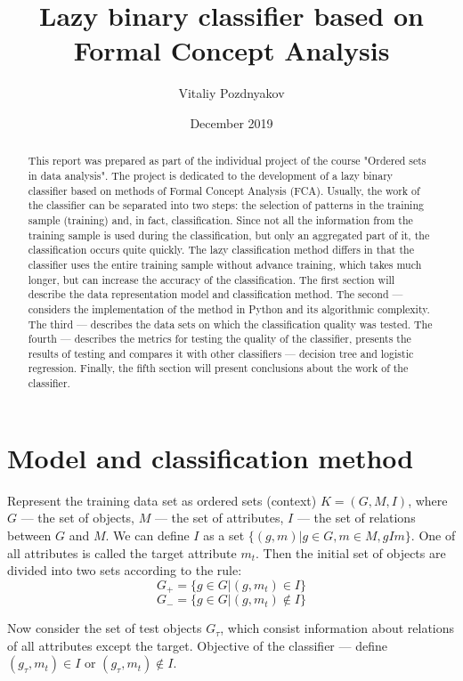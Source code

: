 \documentclass{article}
\author{Vitaliy Pozdnyakov}
\title{Lazy binary classifier based on Formal Concept Analysis}
\date{December 2019}
\begin{document}
\maketitle

\begin{abstract}
	This report was prepared as part of the individual project of the course "Ordered sets in data analysis". The project is dedicated to the development of a lazy binary classifier based on methods of Formal Concept Analysis (FCA). Usually, the work of the classifier can be separated into two steps: the selection of patterns in the training sample (training) and, in fact, classification. Since not all the information from the training sample is used during the classification, but only an aggregated part of it, the classification occurs quite quickly. The lazy classification method differs in that the classifier uses the entire training sample without advance training, which takes much longer, but can increase the accuracy of the classification. The first section will describe the data representation model and classification method. The second --- considers the implementation of the method in Python and its algorithmic complexity. The third --- describes the data sets on which the classification quality was tested. The fourth --- describes the metrics for testing the quality of the classifier, presents the results of testing and compares it with other classifiers --- decision tree and logistic regression. Finally, the fifth section will present conclusions about the work of the classifier.
\end{abstract}

\section{Model and classification method}

Represent the training data set as ordered sets (context) $K = (G, M, I)$, where $G$ --- the set of objects, $M$ --- the set of attributes, $I$ --- the set of relations between $G$ and $M$. We can define $I$ as a set $\{(g, m)|g \in G, m \in M, gIm\}$. One of all attributes is called the target attribute $m_t$. Then the initial set of objects are divided into two sets according to the rule:
$$G_+ = \{g \in G|(g, m_t) \in I\}$$
$$G_- = \{g \in G| (g, m_t) \notin I\}$$

Now consider the set of test objects $G_\tau$, which consist information about relations of all attributes except the target. Objective of the classifier --- define $(g_\tau, m_t) \in I$ or $(g_\tau, m_t) \notin I$. 
\end{document}
